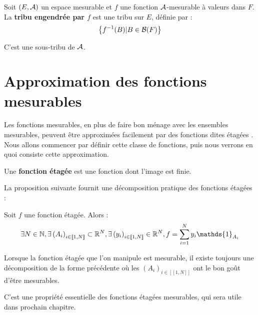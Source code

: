 \documentclass[../integ-proba.tex]{subfiles}
\begin{document}

  \begin{defi}
    \label{def:tribu_engendree}
    Soit $\left( E, \mathcal{A} \right)$ un espace mesurable et $f$ une fonction $\mathcal{A}$-mesurable à valeurs dans $F$.
    La \textbf{tribu engendrée par $f$} est une tribu sur $E$, définie par :
    \begin{displaymath}
      \left\{ f^{-1}(B) | B \in \mathcal{B}(F) \right\}
    \end{displaymath}

    C'est une sous-tribu de $\mathcal{A}$.
  \end{defi}

  \section{Approximation des fonctions mesurables}

  Les fonctions mesurables, en plus de faire bon ménage avec les ensembles mesurables, peuvent être approximées facilement par des fonctions dites \og étagées \fg.
  Nous allons commencer par définir cette classe de fonctions, puis nous verrons en quoi consiste cette approximation.

  \begin{defi}
    Une \textbf{fonction étagée} est une fonction dont l'image est finie.
  \end{defi}

  La proposition suivante fournit une décomposition pratique des fonctions étagées :

  \begin{prop}
    Soit $f$ une fonction étagée.
    Alors :
    \begin{displaymath}
      \exists N \in \N, \exists \left(A_i\right)_{i \in [\![1,N]\!]} \subset \R^N, \exists \left(y_i\right)_{i \in [\![1,N]\!]} \in \R^N, f = \sum_{i=1}^{N}y_i\mathds{1}_{A_i}
    \end{displaymath}
  \end{prop}

  \begin{rem}
    Lorsque la fonction étagée que l'on manipule est mesurable, il existe toujours une décomposition de la forme précédente où les $\left(A_i\right)_{i\in[\![1,N]\!]}$ ont le bon goût d'être mesurables.

    C'est une propriété essentielle des fonctions étagées mesurables, qui sera utile dans prochain chapitre.
  \end{rem}
\end{document}
